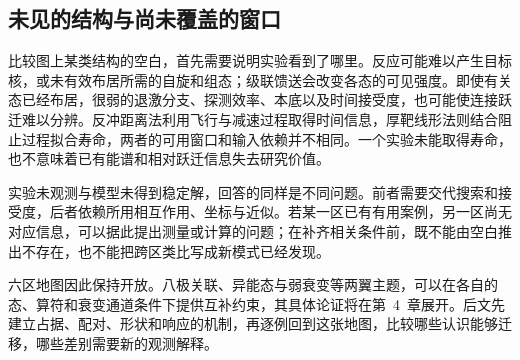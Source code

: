 \subsection{未见的结构与尚未覆盖的窗口}\label{sec:1-4-3}

比较图上某类结构的空白，首先需要说明实验看到了哪里。反应可能难以产生目标核，或未有效布居所需的自旋和组态；级联馈送会改变各态的可见强度。即使有关态已经布居，很弱的退激分支、探测效率、本底以及时间接受度，也可能使连接跃迁难以分辨。反冲距离法利用飞行与减速过程取得时间信息，厚靶线形法则结合阻止过程拟合寿命，两者的可用窗口和输入依赖并不相同。一个实验未能取得寿命，也不意味着已有能谱和相对跃迁信息失去研究价值。

实验未观测与模型未得到稳定解，回答的同样是不同问题。前者需要交代搜索和接受度，后者依赖所用相互作用、坐标与近似。若某一区已有有用案例，另一区尚无对应信息，可以据此提出测量或计算的问题；在补齐相关条件前，既不能由空白推出不存在，也不能把跨区类比写成新模式已经发现。

六区地图因此保持开放。八极关联、异能态与弱衰变等两翼主题，可以在各自的态、算符和衰变通道条件下提供互补约束，其具体论证将在第~4~章展开。后文先建立占据、配对、形状和响应的机制，再逐例回到这张地图，比较哪些认识能够迁移，哪些差别需要新的观测解释。
